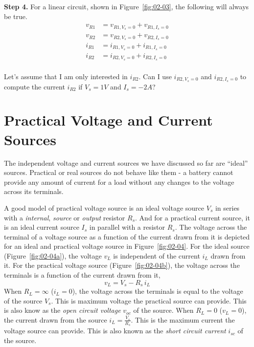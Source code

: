 \noindent\textbf{Step 4.} For a linear circuit, shown in Figure~\ref{fig:02-03}, the following will always be true.
\begin{equation}
    \begin{split}
        v_{R1} &= v_{R1,V_s=0} + v_{R1,I_s=0}\\
        v_{R2} &= v_{R2,V_s=0} + v_{R2,I_s=0}\\
        i_{R1} &= i_{R1,V_s=0} + i_{R1,I_s=0}\\
        i_{R2} &= i_{R2,V_s=0} + i_{R2,I_s=0}\\
    \end{split}
    \label{eq:02-21}
\end{equation}

\noindent Let's assume that I am only interested in $i_{R2}$. Can I use $i_{R2,V_s=0}$ and $i_{R2,I_s=0}$ to compute the current $i_{R2}$ if $V_s = 1V$ and $I_s=-2A$? 

\section{Practical Voltage and Current Sources}
The independent voltage and current sources we have discussed so far are ``ideal'' sources. Practical or real sources do not behave like them - a battery cannot provide any amount of current for a load without any changes to the voltage across its terminals.

A good model of practical voltage source is an ideal voltage source $V_s$ in series with a \textit{internal}, \textit{source} or \textit{output} resistor $R_s$. And for a practical current source, it is an ideal current source $I_s$ in parallel with a resistor $R_s$. The voltage across the terminal of a voltage source as a function of the current drawn from it is depicted for an ideal and practical voltage source in Figure~\ref{fig:02-04}. For the ideal source (Figure~\ref{fig:02-04a}), the voltage $v_L$ is independent of the current $i_L$ drawn from it. For the practical voltage source (Figure~\ref{fig:02-04b}), the voltage across the terminals is a function of the current drawn from it,
\begin{equation}
    v_L = V_s - R_s \, i_L
    \label{eq:02-22}
\end{equation}
When $R_L = \infty$ ($i_L = 0$), the voltage across the terminals is equal to the voltage of the source $V_s$. This is maximum voltage the practical source can provide. This is also know as the \textit{open circuit voltage} $v_{oc}$ of the source. When $R_L = 0$ ($v_L = 0$), the current drawn from the source $i_L = \frac{V_s}{R_s}$. This is the maximum current the voltage source can provide. This is also known as the \textit{short circuit current} $i_{sc}$ of the source.

